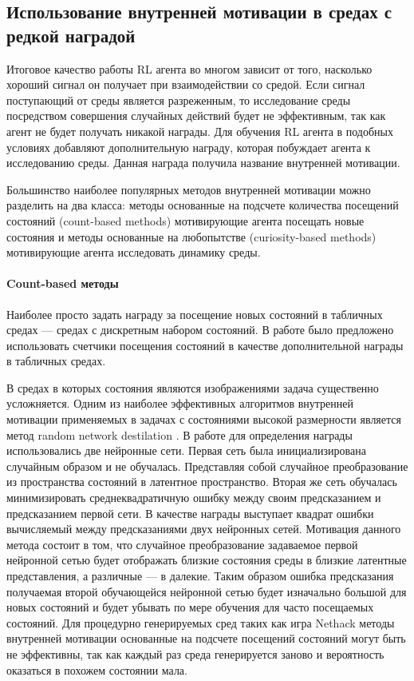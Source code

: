 \subsection{Использование внутренней мотивации в средах с редкой наградой}

Итоговое качество работы RL агента во многом зависит от того, насколько хороший сигнал он получает при взаимодействии со средой. Если сигнал поступающий от среды является разреженным, то исследование среды посредством совершения случайных действий будет не эффективным, так как агент не будет получать никакой награды. Для обучения RL агента в подобных условиях добавляют дополнительную награду, которая побуждает агента к исследованию среды. Данная награда получила название внутренней мотивации. 

Большинство наиболее популярных методов внутренней мотивации можно разделить на два класса: методы основанные на подсчете количества посещений состояний (count-based methods) мотивирующие агента посещать новые состояния и методы основанные на любопытстве (curiosity-based methods) мотивирующие агента исследовать динамику среды. 

\paragraph{Count-based методы} Наиболее просто задать награду за посещение новых состояний в табличных средах --- средах с дискретным набором состояний. В работе \cite{Strehl2008} было предложено использовать счетчики посещения состояний в качестве дополнительной награды в табличных средах. 

В средах в которых состояния являются изображениями задача существенно усложняется. Одним из наиболее эффективных алгоритмов внутренней мотивации применяемых в задачах с состояниями высокой размерности является метод random network destilation \cite{rnd}.
В работе \cite{rnd} для определения награды использовались две нейронные сети. Первая сеть была инициализирована случайным образом и не обучалась. Представляя собой случайное преобразование из пространства состояний в латентное пространство. Вторая же сеть обучалась минимизировать среднеквадратичную ошибку между своим предсказанием и предсказанием первой сети. В качестве награды выступает квадрат ошибки вычисляемый между предсказаниями двух нейронных сетей. Мотивация данного метода состоит в том, что случайное преобразование задаваемое первой нейронной сетью будет отображать близкие состояния среды в близкие латентные представления, а различные --- в далекие. Таким образом ошибка предсказания получаемая второй обучающейся нейронной сетью будет изначально большой для новых состояний и будет убывать по мере обучения для часто посещаемых состояний. 
Для процедурно генерируемых сред таких как игра Nethack \cite{nethack} методы внутренней мотивации основанные на подсчете посещений состояний могут быть не эффективны, так как каждый раз среда генерируется заново и вероятность оказаться в похожем состоянии мала.


